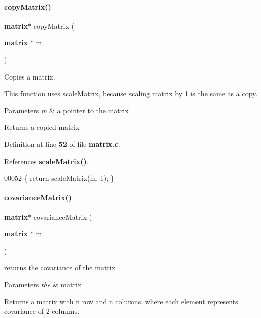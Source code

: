 \paragraph{copy\+Matrix()}
{\footnotesize\ttfamily \textbf{ matrix}$\ast$ copy\+Matrix (\begin{DoxyParamCaption}\item[{\textbf{ matrix} $\ast$}]{m }\end{DoxyParamCaption})}



Copies a matrix. 

This function uses scale\+Matrix, because scaling matrix by 1 is the same as a copy.


\begin{DoxyParams}{Parameters}
{\em m} & a pointer to the matrix \\
\hline
\end{DoxyParams}
\begin{DoxyReturn}{Returns}
a copied matrix 
\end{DoxyReturn}


Definition at line \textbf{ 52} of file \textbf{ matrix.\+c}.



References \textbf{ scale\+Matrix()}.


\begin{DoxyCode}
00052 \{ \textcolor{keywordflow}{return} scaleMatrix(m, 1); \}
\end{DoxyCode}
\mbox{\label{a00125_ae6dab569959c360cf165136a3b625edd}} 
\paragraph{covariance\+Matrix()}
{\footnotesize\ttfamily \textbf{ matrix}$\ast$ covariance\+Matrix (\begin{DoxyParamCaption}\item[{\textbf{ matrix} $\ast$}]{m }\end{DoxyParamCaption})}



returns the covariance of the matrix 


\begin{DoxyParams}{Parameters}
{\em the} & matrix \\
\hline
\end{DoxyParams}
\begin{DoxyReturn}{Returns}
a matrix with n row and n columns, where each element represents covariance of 2 columns. 
\end{DoxyReturn}


